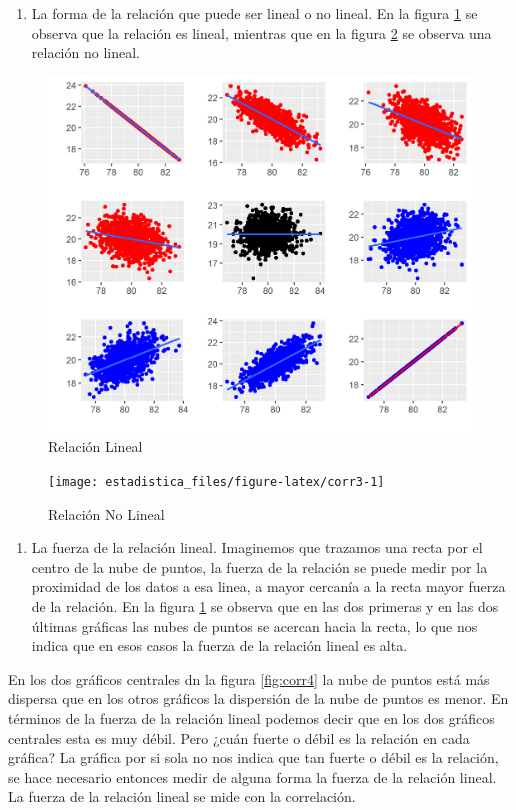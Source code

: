 \documentclass[]{book}
\providecommand{\tightlist}{%
  \setlength{\itemsep}{0pt}\setlength{\parskip}{0pt}}
\begin{document}
\begin{enumerate}
\def\labelenumi{\arabic{enumi}.}
\setcounter{enumi}{1}
\tightlist
\item
  La forma de la relación que puede ser lineal o no lineal. En la figura \ref{fig:corr2} se observa que la relación es lineal, mientras que en la figura \ref{fig:corr3} se observa una relación no lineal.
\end{enumerate}

\begin{figure}[h]

{\centering \includegraphics[width=0.5\linewidth]{corr2} 

}

\caption{Relación Lineal}\label{fig:corr2}
\end{figure}

\begin{figure}[h]

{\centering \texttt{[image: estadistica\_files/figure-latex/corr3-1]} 

}

\caption{Relación No Lineal}\label{fig:corr3}
\end{figure}

\begin{enumerate}
\def\labelenumi{\arabic{enumi}.}
\setcounter{enumi}{2}
\tightlist
\item
  La fuerza de la relación lineal. Imaginemos que trazamos una recta por el centro de la nube de puntos, la fuerza de la relación se puede medir por la proximidad de los datos a esa linea, a mayor cercanía a la recta mayor fuerza de la relación. En la figura \ref{fig:corr2} se observa que en las dos primeras y en las dos últimas gráficas las nubes de puntos se acercan hacia la recta, lo que nos indica que en esos casos la fuerza de la relación lineal es alta.
\end{enumerate}

En los dos gráficos centrales dn la figura \ref{fig:corr4} la nube de puntos está más dispersa que en los otros gráficos la dispersión de la nube de puntos es menor. En términos de la fuerza de la relación lineal podemos decir que en los dos gráficos centrales esta es muy débil. Pero ¿cuán fuerte o débil es la relación en cada gráfica? La gráfica por si sola no nos indica que tan fuerte o débil es la relación, se hace necesario entonces medir de alguna forma la fuerza de la relación lineal. La fuerza de la relación lineal se mide con la correlación.
\end{document}
